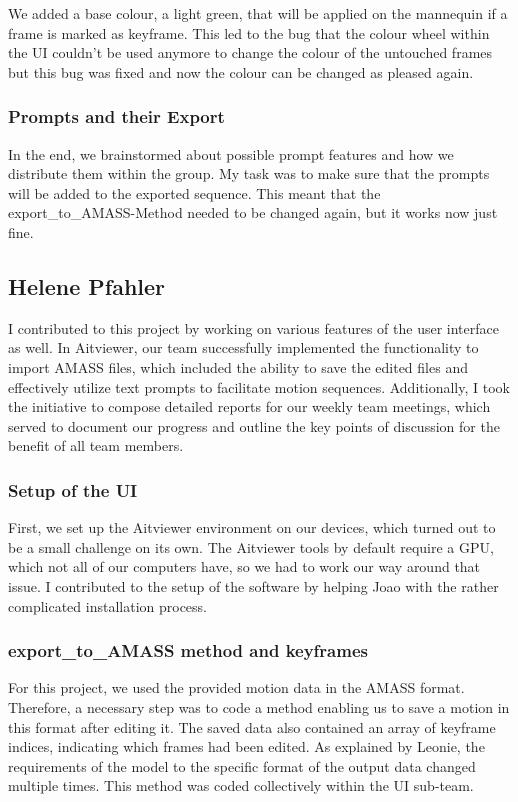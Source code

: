 \documentclass[a4paper]{scrartcl}
\begin{document}
We added a base colour, a light green, that will be applied on the mannequin if a frame is marked as keyframe. This led to the bug that the colour wheel within the UI couldn't be used anymore to change the colour of the untouched frames but this bug was fixed and now the colour can be changed as pleased again.

\subsubsection*{Prompts and their Export}
In the end, we brainstormed about possible prompt features and how we distribute them within the group. My task was to make sure that the prompts will be added to the exported sequence. This meant that the export\_to\_AMASS-Method needed to be changed again, but it works now just fine.  


\subsection*{Helene Pfahler}
I contributed to this project by working on various features of the user interface as well. In Aitviewer, our team successfully implemented the functionality to import AMASS files, which included the ability to save the edited files and effectively utilize text prompts to facilitate motion sequences.  
Additionally, I took the initiative to compose detailed reports for our weekly team meetings, which served to document our progress and outline the key points of discussion for the benefit of all team members.  

\subsubsection*{Setup of the UI}  
First, we set up the Aitviewer environment on our devices, which turned out to be a small challenge on its own. The Aitviewer tools by default require a GPU, which not all of our computers have, so we had to work our way around that issue. I contributed to the setup of the software by helping Joao with the rather complicated installation process.

\subsubsection*{export\_to\_AMASS method and keyframes}
For this project, we used the provided motion data in the AMASS format. Therefore, a necessary step was to code a method enabling us to save a motion in this format after editing it. The saved data also contained an array of keyframe indices, indicating which frames had been edited. As explained by Leonie, the requirements of the model to the specific format of the output data changed multiple times. This method was coded collectively within the UI sub-team.  
\end{document}
